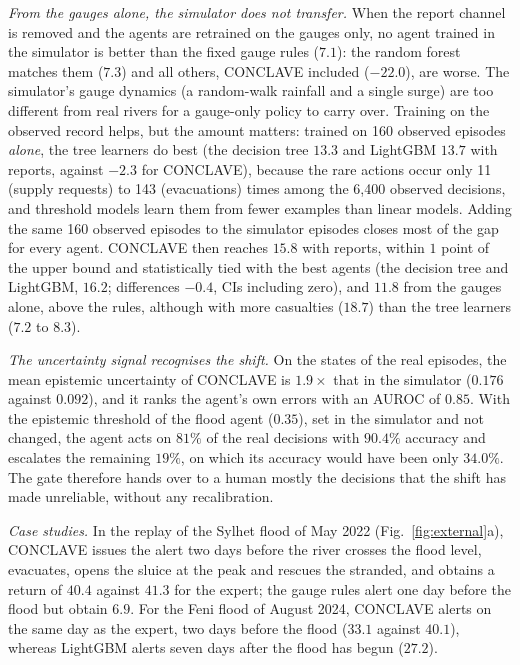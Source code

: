 \documentclass[journal]{IEEEtran}
\begin{document}
\textit{From the gauges alone, the simulator does not transfer.} When the
report channel is removed and the agents are retrained on the gauges only, no
agent trained in the simulator is better than the fixed gauge rules ($7.1$):
the random forest matches them ($7.3$) and all others, CONCLAVE included
($-22.0$), are worse. The simulator's gauge dynamics (a random-walk rainfall
and a single surge) are too different from real rivers for a gauge-only policy
to carry over. Training on the observed record helps, but the amount matters:
trained on 160 observed episodes \emph{alone}, the tree learners do best (the
decision tree $13.3$ and LightGBM $13.7$ with reports, against $-2.3$ for
CONCLAVE), because the rare actions occur only 11 (supply requests) to 143
(evacuations) times among the 6{,}400 observed decisions, and threshold models
learn them from fewer examples than linear models. Adding the same 160 observed episodes to the
simulator episodes closes most of the gap for every agent. CONCLAVE then reaches
$15.8$ with reports, within $1$ point of the upper bound and statistically tied
with the best agents (the decision tree and LightGBM, $16.2$; differences
$-0.4$, CIs including zero), and $11.8$ from the gauges alone, above the rules, although with more
casualties ($18.7$) than the tree learners ($7.2$ to $8.3$).

\textit{The uncertainty signal recognises the shift.} On the states of the
real episodes, the mean epistemic uncertainty of CONCLAVE is $1.9\times$ that
in the simulator ($0.176$ against $0.092$), and it ranks the agent's own errors
with an AUROC of $0.85$. With the epistemic threshold of the flood agent
($0.35$), set in the simulator and not changed, the agent acts on $81\%$ of the real decisions with $90.4\%$ accuracy and
escalates the remaining $19\%$, on which its accuracy would have been only
$34.0\%$. The gate therefore hands over to a human mostly the decisions that
the shift has made unreliable, without any recalibration.

\textit{Case studies.} In the replay of the Sylhet flood of May 2022
(Fig.~\ref{fig:external}a), CONCLAVE issues the alert two days before the river
crosses the flood level, evacuates, opens the sluice at the peak and rescues
the stranded, and obtains a return of $40.4$ against $41.3$ for the expert; the
gauge rules alert one day before the flood but obtain $6.9$. For the Feni flood
of August 2024, CONCLAVE alerts on the same day as the expert, two days before
the flood ($33.1$ against $40.1$), whereas LightGBM alerts seven days after the
flood has begun ($27.2$).
\end{document}
